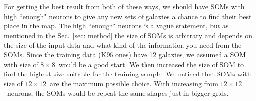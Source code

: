     For getting the best result from both of these ways, we should have SOMs with high ``enough"  neurons to give any new sets of galaxies a chance to find their best place in the map.
    The  high ``enough"  neurons is a vague statement, but as mentioned in the Sec.~\ref{sec: method} the size of SOMs is arbitrary and depends on the size of the input data and what kind of the information you need from the SOMs.
    Since the training data (K96 ones) have 12 galaxies, we assumed a SOM with size of $8\times8$~would be a good start.
    We then increased the size of SOM to find the highest size suitable for the training sample.
    We noticed that SOMs with size of $12\times12$~are the maximum possible choice.
    With increasing from $12\times12$~neurons, the SOMs would be repeat the same shapes just in bigger grids.
    
